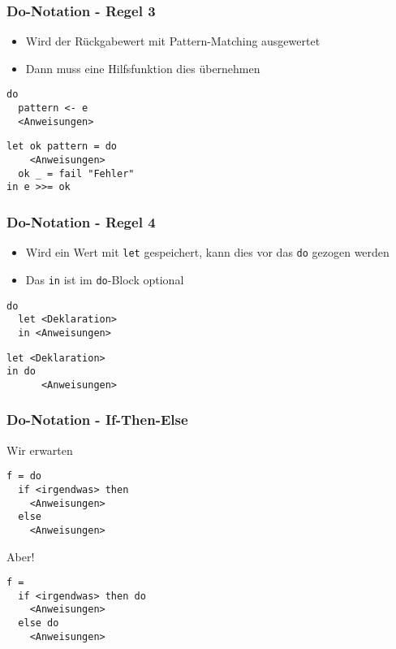\documentclass[fleqn,11pt,aspectratio=43]{beamer}
\begin{document}
\begin{frame}[fragile]
\frametitle{Do-Notation - Regel 3}
\begin{block}{\vspace*{-3ex}}
\begin{itemize}
\item Wird der Rückgabewert mit Pattern-Matching ausgewertet
\item Dann muss eine Hilfsfunktion dies übernehmen
\end{itemize}
\end{block}
\begin{lstlisting}
do 
  pattern <- e
  <Anweisungen>
\end{lstlisting}	
\pause
\begin{lstlisting}
let ok pattern = do 
    <Anweisungen>
  ok _ = fail "Fehler" 
in e >>= ok
\end{lstlisting}	
\end{frame}

\begin{frame}[fragile]
\frametitle{Do-Notation - Regel 4}
\begin{block}{\vspace*{-3ex}}
\begin{itemize}
\item Wird ein Wert mit \lstinline|let| gespeichert, kann dies vor das \lstinline|do| gezogen werden
\item Das \lstinline|in| ist im \lstinline|do|-Block optional
\end{itemize}
\end{block}
\begin{lstlisting}
do 
  let <Deklaration>
  in <Anweisungen>
\end{lstlisting}	
\pause
\begin{lstlisting}
let <Deklaration>
in do
      <Anweisungen>
\end{lstlisting}	
\end{frame}

\begin{frame}[fragile]
\frametitle{Do-Notation - If-Then-Else}
\begin{block}{Wir erwarten}
\begin{lstlisting}
f = do 
  if <irgendwas> then
    <Anweisungen>
  else 
    <Anweisungen>
\end{lstlisting}	
\end{block}
\vspace*{-3ex}
\begin{block}{Aber!}
\begin{lstlisting}
f = 
  if <irgendwas> then do
    <Anweisungen>
  else do
    <Anweisungen>
\end{lstlisting}	
\end{block}
\end{frame}
\end{document}
